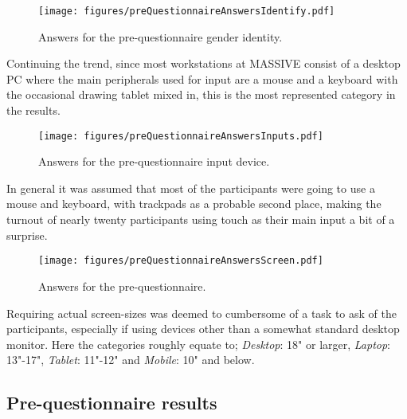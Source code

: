     \begin{figure}[h!]
      \centering
      \texttt{[image: figures/preQuestionnaireAnswersIdentify.pdf]}
      \caption{Answers for the pre-questionnaire gender identity.}
    \end{figure}

    Continuing the trend, since most workstations at MASSIVE consist of a
    desktop PC where the main peripherals used for input are a mouse and a
    keyboard with the occasional drawing tablet mixed in, this is the most
    represented category in the results.

    \begin{figure}[h!]
      \centering
      \texttt{[image: figures/preQuestionnaireAnswersInputs.pdf]}
      \caption{Answers for the pre-questionnaire input device.}
    \end{figure}

    \vspace{-0.2cm}
    In general it was assumed that most of the participants were going to
    use a mouse and keyboard, with trackpads as a probable second place,
    making the turnout of nearly twenty participants using touch as their
    main input a bit of a surprise.

    \begin{figure}[h!]
      \centering
      \texttt{[image: figures/preQuestionnaireAnswersScreen.pdf]}
      \caption{Answers for the pre-questionnaire.}
    \end{figure}

    Requiring actual screen-sizes was deemed to cumbersome of a task to
    ask of the participants, especially if using devices other than a
    somewhat standard desktop monitor. Here the categories roughly equate
    to; \textit{Desktop}: 18" or larger, \textit{Laptop}: 13"-17", \textit{Tablet}:
    11"-12" and \textit{Mobile}: 10" and below.

  \subsection{Pre-questionnaire results}

